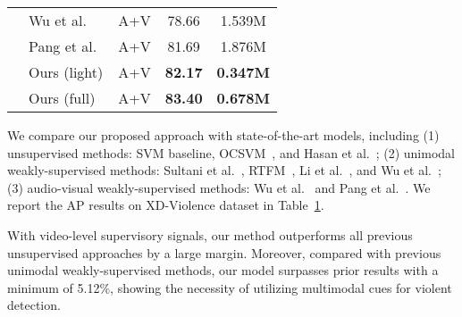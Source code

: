 \documentclass[sigconf]{acmart}
\begin{document}
\begin{table}[tb]
\begin{tabular}{@{}clccc@{}}
                                   & Wu et al.~\cite{wu2020not}               & A+V            & 78.66          &  1.539M      \\
                                   & Pang et al.~\cite{pang2021violence}               & A+V            & 81.69          &  1.876M      \\ \cmidrule(l){2-5} 
                                   & Ours (light)                                      & A+V            & \textbf{82.17} &  \textbf{0.347M}      \\ 
                                   & Ours (full)                                       & A+V            & \textbf{83.40} &  \textbf{0.678M}      \\ \bottomrule
\end{tabular}
\label{exp:table1}
\end{table}

We compare our proposed approach with state-of-the-art models, including (1) unsupervised methods: SVM baseline, OCSVM~\cite{scholkopf1999support}, and Hasan et al.~\cite{hasan2016learning}; (2) unimodal weakly-supervised methods: Sultani et al.~\cite{sultani2018real}, RTFM~\cite{tian2021weakly}, Li et al.~\cite{li2022self}, and Wu et al.~\cite{wu2021learning}; (3) audio-visual weakly-supervised methods: Wu et al.~\cite{wu2020not} and Pang et al.~\cite{pang2021violence}. We report the AP results on XD-Violence dataset in Table~\ref{exp:table1}. 

With video-level supervisory signals, our method outperforms all previous unsupervised approaches by a large margin. Moreover, compared with previous unimodal weakly-supervised methods, our model surpasses prior results with a minimum of 5.12\%, showing the necessity of utilizing multimodal cues for violent detection. 
\end{document}
